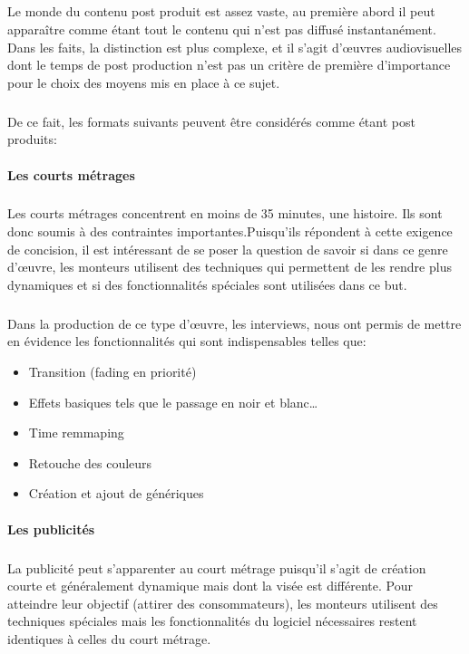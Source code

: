 \subparagraph{}

Le monde du contenu post produit est assez vaste, au première abord
il peut apparaître comme étant tout le contenu qui n'est pas diffusé
instantanément. Dans les faits, la distinction est plus complexe, et il
s'agit d'œuvres audiovisuelles dont le temps de post production n'est
pas un critère de première d'importance pour le choix des moyens mis
en place à ce sujet.

\subparagraph{}

De ce fait, les formats suivants peuvent être considérés comme étant
post produits:

\paragraph{Les courts métrages}

\subparagraph{}

Les courts métrages concentrent en moins de 35 minutes, une histoire. Ils
sont donc soumis à des contraintes importantes.Puisqu'ils répondent
à cette exigence de concision, il est intéressant de se poser la
question de savoir si dans ce genre d'œuvre, les monteurs utilisent
des techniques qui permettent de les rendre plus dynamiques et si des
fonctionnalités spéciales sont utilisées dans ce but.

\subparagraph{}

Dans la production de ce type d'œuvre, les interviews, nous ont permis
de mettre en évidence les fonctionnalités qui sont indispensables
telles que: \begin{itemize} \setlength{\itemsep}{2mm}
  \item{Transition (fading en priorité)} \item{Effets basiques tels que
  le passage en noir et blanc\ldots} \item{Time remmaping} \item{Retouche
  des couleurs} \item{Création et ajout de génériques}
\end{itemize}

\paragraph {Les publicités}

\subparagraph{}

La publicité peut s'apparenter au court métrage puisqu'il s'agit de
création courte et généralement dynamique mais dont la visée est
différente. Pour atteindre leur objectif (attirer des consommateurs),
les monteurs utilisent des techniques spéciales mais les fonctionnalités
du logiciel nécessaires restent identiques à celles du court métrage.

